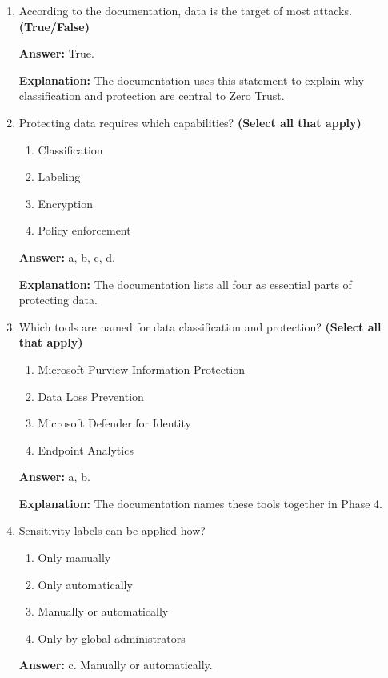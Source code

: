 \documentclass[10pt]{article}
\begin{document}
\begin{enumerate}[leftmargin=*]
\textbf{Explanation:} Phase 4 is specifically named Classify and protect data.

\item According to the documentation, data is the target of most attacks. \textbf{(True/False)}

\textbf{Answer:} True.

\textbf{Explanation:} The documentation uses this statement to explain why classification and protection are central to Zero Trust.

\item Protecting data requires which capabilities? \textbf{(Select all that apply)}
\begin{enumerate}[label=\alph*., leftmargin=1.5em]
\item Classification
\item Labeling
\item Encryption
\item Policy enforcement
\end{enumerate}
\textbf{Answer:} a, b, c, d.

\textbf{Explanation:} The documentation lists all four as essential parts of protecting data.

\item Which tools are named for data classification and protection? \textbf{(Select all that apply)}
\begin{enumerate}[label=\alph*., leftmargin=1.5em]
\item Microsoft Purview Information Protection
\item Data Loss Prevention
\item Microsoft Defender for Identity
\item Endpoint Analytics
\end{enumerate}
\textbf{Answer:} a, b.

\textbf{Explanation:} The documentation names these tools together in Phase 4.

\item Sensitivity labels can be applied how?
\begin{enumerate}[label=\alph*., leftmargin=1.5em]
\item Only manually
\item Only automatically
\item Manually or automatically
\item Only by global administrators
\end{enumerate}
\textbf{Answer:} c. Manually or automatically.


\end{enumerate}
\end{document}
